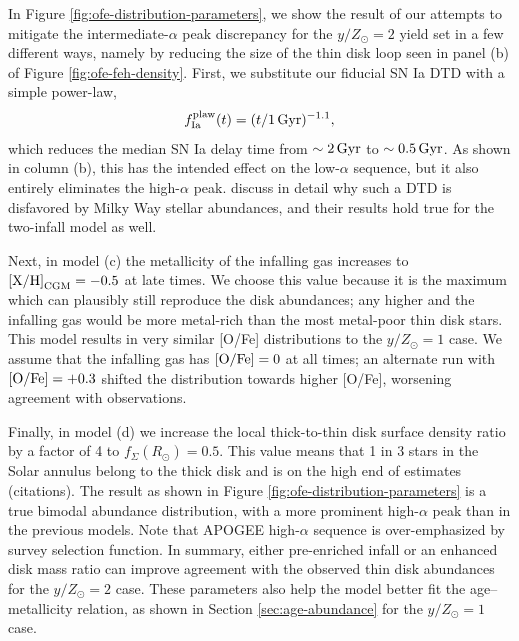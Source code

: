 \documentclass[twocolumn,twocolappendix,linenumbers]{aastex631}
\newcommand{\todo}[1]{{\color{red}#1}}
\newcommand{\mathXH}{{\rm [X/H]}}
\newcommand{\mathOFe}{{\rm [O/Fe]}}
\newcommand{\yZ}[1]{$y/Z_\odot=#1$}
\begin{document}
In Figure \ref{fig:ofe-distribution-parameters}, we show the result of our attempts to mitigate the intermediate-$\alpha$ peak discrepancy for the \yZ{2} yield set in a few different ways, namely by reducing the size of the thin disk loop seen in panel (b) of Figure \ref{fig:ofe-feh-density}. First, we substitute our fiducial SN Ia DTD with a simple power-law,
\begin{equation}
    f_{\rm Ia}^{\rm plaw}(t) = (t/1\,\rm{Gyr})^{-1.1},
    \label{eq:powerlaw-dtd}
\end{equation}
which reduces the median SN Ia delay time from $\sim2\,{\rm Gyr}$ to $\sim0.5\,{\rm Gyr}$. As shown in column (b), this has the intended effect on the low-$\alpha$ sequence, but it also entirely eliminates the high-$\alpha$ peak. \citet{dubay_galactic_2024} discuss in detail why such a DTD is disfavored by Milky Way stellar abundances, and their results hold true for the two-infall model as well.

Next, in model (c) the metallicity of the infalling gas increases to $\mathXH_{\rm CGM}=-0.5$ at late times. We choose this value because it is the maximum which can plausibly still reproduce the disk abundances; any higher and the infalling gas would be more metal-rich than the most metal-poor thin disk stars. This model results in very similar [O/Fe] distributions to the $y/Z_\odot=1$ case. We assume that the infalling gas has $\mathOFe=0$ at all times; an alternate run with $\mathOFe=+0.3$ shifted the distribution towards higher [O/Fe], worsening agreement with observations. 

Finally, in model (d) we increase the local thick-to-thin disk surface density ratio by a factor of 4 to $f_\Sigma(R_\odot)=0.5$. This value means that 1 in 3 stars in the Solar annulus belong to the thick disk and is on the high end of estimates \todo{(citations)}. The result as shown in Figure \ref{fig:ofe-distribution-parameters} is a true bimodal abundance distribution, with a more prominent high-$\alpha$ peak than in the previous models. \todo{Note that APOGEE high-$\alpha$ sequence is over-emphasized by survey selection function.} In summary, either pre-enriched infall or an enhanced disk mass ratio can improve agreement with the observed thin disk abundances for the \yZ{2} case. These parameters also help the model better fit the age--metallicity relation, as shown in Section \ref{sec:age-abundance} for the \yZ{1} case.
\end{document}
